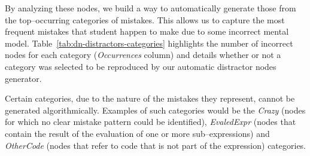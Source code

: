 \begin{chapterBody}
By analyzing these nodes, we build a way to automatically generate those
from the\hfill\break
top–occurring categories of mistakes. This allows us to capture the most
frequent mistakes that student happen to make due to some incorrect mental
model.
Table~\ref{tab:dn-distractors-categories} highlights the number of incorrect
nodes for each category (\textit{Occurrences} column) and details whether or not
a category was selected to be reproduced by our automatic distractor nodes
generator.

Certain categories, due to the nature of the mistakes they represent, cannot
be generated algorithmically. Examples of such categories would be the
\textit{Crazy} (nodes for which no clear mistake pattern could be identified), 
\textit{EvaledExpr} (nodes that contain the result of the evaluation of one
or more sub–expressions) and \textit{OtherCode} (nodes that refer to code that is
not part of the expression) categories.


\end{chapterBody}
